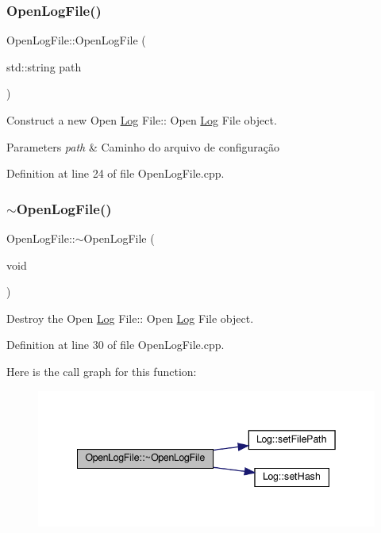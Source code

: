 \subsubsection{\texorpdfstring{Open\+Log\+File()}{OpenLogFile()}}
{\footnotesize\ttfamily Open\+Log\+File\+::\+Open\+Log\+File (\begin{DoxyParamCaption}\item[{std\+::string}]{path }\end{DoxyParamCaption})}



Construct a new Open \hyperlink{class_log}{Log} File\+:\+: Open \hyperlink{class_log}{Log} File object. 


\begin{DoxyParams}{Parameters}
{\em path} & Caminho do arquivo de configuração \\
\hline
\end{DoxyParams}


Definition at line 24 of file Open\+Log\+File.\+cpp.

\mbox{\label{class_open_log_file_a5583bd1705452a1c20291870539bcec0}} 
\subsubsection{\texorpdfstring{$\sim$\+Open\+Log\+File()}{~OpenLogFile()}}
{\footnotesize\ttfamily Open\+Log\+File\+::$\sim$\+Open\+Log\+File (\begin{DoxyParamCaption}\item[{void}]{ }\end{DoxyParamCaption})}



Destroy the Open \hyperlink{class_log}{Log} File\+:\+: Open \hyperlink{class_log}{Log} File object. 



Definition at line 30 of file Open\+Log\+File.\+cpp.

Here is the call graph for this function\+:
\nopagebreak
\begin{figure}[H]
\begin{center}
\leavevmode
\includegraphics[width=342pt]{db/d15/class_open_log_file_a5583bd1705452a1c20291870539bcec0_cgraph}
\end{center}
\end{figure}


